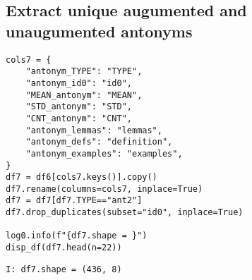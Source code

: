 \documentclass[a4paper,10pt,onecolumn,oneside,openright]{article}
\begin{document}
\subsection{Extract unique augumented and unaugumented antonyms}
\label{sec:orga7876a7}
\begin{verbatim}
cols7 = {
    "antonym_TYPE": "TYPE",
    "antonym_id0": "id0",
    "MEAN_antonym": "MEAN",
    "STD_antonym": "STD",
    "CNT_antonym": "CNT",
    "antonym_lemmas": "lemmas",
    "antonym_defs": "definition",
    "antonym_examples": "examples",
}
df7 = df6[cols7.keys()].copy()
df7.rename(columns=cols7, inplace=True)
df7 = df7[df7.TYPE=="ant2"]
df7.drop_duplicates(subset="id0", inplace=True)

log0.info(f"{df7.shape = }")
disp_df(df7.head(n=22))
\end{verbatim}

\begin{verbatim}
I: df7.shape = (436, 8)
\end{verbatim}
\end{document}
